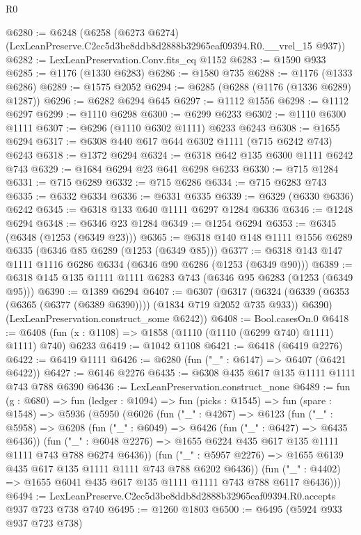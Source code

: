 \begin{lexlean}{R0}
\begin{coremodule}
@6280 := @6248
    (@6258 (@6273 @6274) (LexLeanPreserve.C2ec5d3be8ddb8d2888b32965eaf09394.R0.__vrel_15 @937))
@6282 := LexLeanPreservation.Conv.fits_eq @1152
@6283 := @1590 @933
@6285 := @1176 (@1330 @6283)
@6286 := @1580 @735
@6288 := @1176 (@1333 @6286)
@6289 := @1575 @2052
@6294 := @6285 (@6288 (@1176 (@1336 @6289) @1287))
@6296 := @6282 @6294 @645
@6297 := @1112 @1556
@6298 := @1112 @6297
@6299 := @1110 @6298
@6300 := @6299 @6233
@6302 := @1110 @6300 @1111
@6307 := @6296 (@1110 @6302 @1111) @6233 @6243
@6308 := @1655 @6294
@6317 := @6308 @440 @617 @644 @6302 @1111 (@715 @6242 @743) @6243
@6318 := @1372 @6294
@6324 := @6318 @642 @135 @6300 @1111 @6242 @743
@6329 := @1684 @6294 @23 @641 @6298 @6233
@6330 := @715 @1284
@6331 := @715 @6289
@6332 := @715 @6286
@6334 := @715 @6283 @743
@6335 := @6332 @6334
@6336 := @6331 @6335
@6339 := @6329 (@6330 @6336) @6242
@6345 := @6318 @133 @640 @1111 @6297 @1284 @6336
@6346 := @1248 @6294
@6348 := @6346 @23 @1284
@6349 := @1254 @6294
@6353 := @6345 (@6348 (@1253 (@6349 @23)))
@6365 := @6318 @140 @148 @1111 @1556 @6289 @6335 (@6346 @85 @6289 (@1253 (@6349 @85)))
@6377 := @6318 @143 @147 @1111 @1116 @6286 @6334 (@6346 @90 @6286 (@1253 (@6349 @90)))
@6389 := @6318 @145 @135 @1111 @1111 @6283 @743 (@6346 @95 @6283 (@1253 (@6349 @95)))
@6390 := @1389 @6294
@6407 := @6307
    (@6317
      (@6324 (@6339 (@6353 (@6365 (@6377 (@6389 @6390)))) (@1834 @719 @2052 @735 @933)) @6390)
      (LexLeanPreservation.construct_some @6242))
@6408 := Bool.casesOn.{0}
@6418 := @6408 (fun (x : @1108) => @1858 (@1110 (@1110 (@6299 @740) @1111) @1111) @740) @6233
@6419 := @1042 @1108
@6421 := @6418 (@6419 @2276)
@6422 := @6419 @1111
@6426 := @6280 (fun ("_" : @6147) => @6407 (@6421 @6422))
@6427 := @6146 @2276
@6435 := @6308 @435 @617 @135 @1111 @1111 @743 @788 @6390
@6436 := LexLeanPreservation.construct_none
@6489 := fun (g : @680) =>
  fun (ledger : @1094) =>
  fun (picks : @1545) =>
  fun (spare : @1548) =>
  @5936
    (@5950
      (@6026
        (fun ("_" : @4267) =>
        @6123
          (fun ("_" : @5958) =>
          @6208
            (fun ("_" : @6049) => @6426 (fun ("_" : @6427) => @6435 @6436))
            (fun ("_" : @6048 @2276) =>
            @1655 @6224 @435 @617 @135 @1111 @1111 @743 @788 @6274 @6436))
          (fun ("_" : @5957 @2276) => @1655 @6139 @435 @617 @135 @1111 @1111 @743 @788 @6202 @6436))
        (fun ("_" : @4402) => @1655 @6041 @435 @617 @135 @1111 @1111 @743 @788 @6117 @6436)))
@6494 := LexLeanPreserve.C2ec5d3be8ddb8d2888b32965eaf09394.R0.accepts @937 @723 @738 @740
@6495 := @1260 @1803
@6500 := @6495 (@5924 @933 @937 @723 @738)

\end{coremodule}
\end{lexlean}
